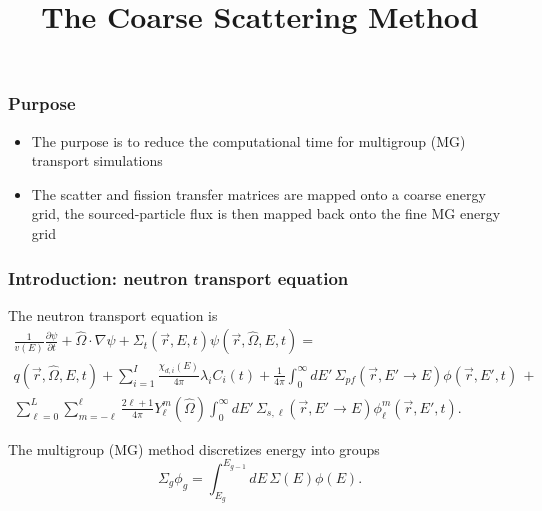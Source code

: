 \documentclass[xcolor=dvipsnames]{beamer}
\title{The Coarse Scattering Method}
\newlength{\wideitemsep}
\let\olditem\item
\renewcommand{\item}{\setlength{\itemsep}{\wideitemsep}\olditem}
\begin{document}

\begin{frame}
\frametitle{Purpose}

\begin{itemize}
\item The purpose is to reduce the computational time for multigroup (MG) transport simulations
\item The scatter and fission transfer matrices are mapped onto a coarse energy grid, the sourced-particle flux is then mapped back onto the fine MG energy grid
\end{itemize}

\end{frame}


\begin{frame}
  \frametitle{Introduction: neutron transport equation}

The neutron transport equation is
\begin{multline*}
\label{eq:transport}
\frac{1}{v(E)} \frac{\partial \psi}{\partial t} + \hat{\Omega} \cdot \nabla \psi+ \Sigma_{t}(\vec{r},E,t) \psi(\vec{r},\hat{\Omega},E,t) = \\q(\vec{r},\hat{\Omega},E,t) + \sum_{i=1}^I \frac{\chi_{d,i}(E)}{4 \pi} \lambda_i C_i(t) +  \frac{1}{4 \pi} \int_0^\infty dE' \,  \Sigma_{pf}(\vec{r},E' \to E) \phi(\vec{r},E',t) \, + \\ \sum_{\ell=0}^L \sum_{m=-\ell}^\ell \frac{2 \ell + 1}{4 \pi} Y_\ell^m(\hat{\Omega}) \int_0^\infty dE' \,  \Sigma_{s,\ell}(\vec{r},E' \to E) \phi_{\ell}^m(\vec{r},E',t) .
\end{multline*}

\pause

\vspace{0.5cm}

The multigroup (MG) method discretizes energy into groups
\begin{equation*}
\label{eq:transport}
\Sigma_g \phi_g = \int_{E_{g}}^{E_{g-1}} dE \,\Sigma(E) \phi(E) .
\end{equation*}

\end{frame}
\end{document}
